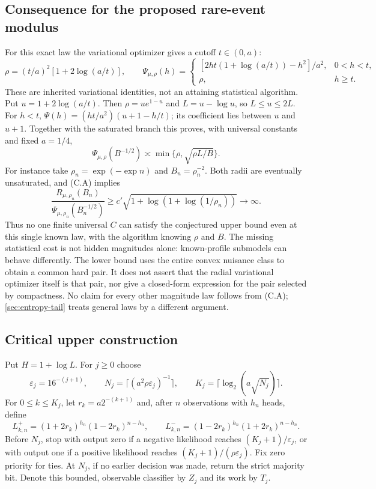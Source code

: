 \subsection{Consequence for the proposed rare-event modulus}
For this exact law the variational optimizer gives a cutoff $t\in(0,a)$:
\[
 \rho=(t/a)^2[1+2\log(a/t)],\qquad
 \Psi_{\mu,\rho}(h)=
 \begin{cases}
 [2ht(1+\log(a/t))-h^2]/a^2,&0<h<t,\\
 \rho,&h\ge t.
 \end{cases}                                          \tag{C.E}
\]
These are inherited variational identities, not an attaining statistical
algorithm. Put $u=1+2\log(a/t)$. Then $\rho=u e^{1-u}$ and
$L=u-\log u$, so $L\le u\le2L$. For $h<t$,
$\Psi(h)=(ht/a^2)(u+1-h/t)$; its coefficient lies between $u$ and $u+1$.
Together with the saturated branch this proves, with universal constants
and fixed $a=1/4$,
\[
 \Psi_{\mu,\rho}(B^{-1/2})\asymp\min\{\rho,\sqrt{\rho L/B}\}.
\]
For instance take $\rho_n=\exp(-\exp n)$ and $B_n=\rho_n^{-2}$.
Both radii are eventually unsaturated, and (C.A) implies
\[
 \frac{R_{\mu,\rho_n}(B_n)}{\Psi_{\mu,\rho_n}(B_n^{-1/2})}
       \ge c'\sqrt{1+\log(1+\log(1/\rho_n))}\longrightarrow\infty.
\]
Thus no one finite universal $C$ can
satisfy the conjectured upper bound even at this single known law, with
the algorithm knowing $\rho$ and $B$. The missing statistical cost is not
hidden magnitudes alone: known-profile submodels can behave differently.
The lower bound uses the entire convex nuisance class to obtain a common
hard pair. It does not assert that the radial variational optimizer itself
is that pair, nor give a closed-form expression for the pair selected by
compactness. No claim for every other magnitude law follows from (C.A);
\cref{sec:entropy-tail} treats general laws by a different argument.

\subsection{Critical upper construction}
Put $H=1+\log L$. For $j\ge0$ choose
\[
 \varepsilon_j=16^{-(j+1)},\qquad
 N_j=\lceil(a^2\rho\varepsilon_j)^{-1}\rceil,\qquad
 K_j=\lceil\log_2(a\sqrt{N_j})\rceil.
\]
For $0\le k\le K_j$, let $r_k=a2^{-(k+1)}$ and, after $n$ observations
with $h_n$ heads, define
\[
 L^+_{k,n}=(1+2r_k)^{h_n}(1-2r_k)^{n-h_n},\qquad
 L^-_{k,n}=(1-2r_k)^{h_n}(1+2r_k)^{n-h_n}.
\]
Before $N_j$, stop with output zero if a negative likelihood reaches
$(K_j+1)/\varepsilon_j$, or with output one if a positive likelihood reaches
$(K_j+1)/(\rho\varepsilon_j)$. Fix zero priority for ties. At $N_j$, if no
earlier decision was made, return the strict majority bit. Denote this bounded,
observable classifier by $Z_j$ and its work by $T_j$.

